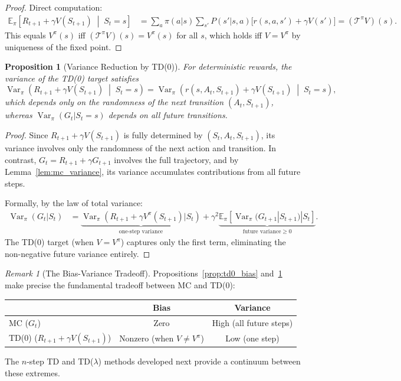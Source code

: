 \documentclass[11pt,a4paper]{article}
\theoremstyle{definition}
\theoremstyle{plain}
\newtheorem{proposition}[theorem]{Proposition}
\theoremstyle{remark}
\newtheorem{remark}{Remark}[section]
\DeclareMathOperator{\Var}{Var}
\newcommand{\E}{\mathbb{E}}
\begin{document}
\begin{proof}
Direct computation:
\begin{align}
    \E_\pi\!\left[R_{t+1} + \gamma V(S_{t+1}) \;\middle|\; S_t = s\right]
    &= \sum_a \pi(a|s) \sum_{s'} P(s'|s,a)\bigl[r(s,a,s') + \gamma V(s')\bigr]
    = (\mathcal{T}^\pi V)(s). \label{eq:td0_bias_proof}
\end{align}
This equals $V^\pi(s)$ iff $(\mathcal{T}^\pi V)(s) = V^\pi(s)$ for all $s$, which holds iff $V = V^\pi$ by uniqueness of the fixed point.
\end{proof}

\begin{proposition}[Variance Reduction by TD(0)]
\label{prop:td0_variance}
For deterministic rewards, the variance of the TD(0) target satisfies
\begin{equation}
    \Var_\pi\!\left(R_{t+1} + \gamma V(S_{t+1}) \;\middle|\; S_t = s\right)
    = \Var_\pi\!\left(r(s, A_t, S_{t+1}) + \gamma V(S_{t+1}) \;\middle|\; S_t = s\right),
    \label{eq:td0_variance}
\end{equation}
which depends only on the randomness of the \emph{next} transition $(A_t, S_{t+1})$, whereas $\Var_\pi(G_t | S_t = s)$ depends on all future transitions.
\end{proposition}

\begin{proof}
Since $R_{t+1} + \gamma V(S_{t+1})$ is fully determined by $(S_t, A_t, S_{t+1})$, its variance involves only the randomness of the next action and transition. In contrast, $G_t = R_{t+1} + \gamma G_{t+1}$ involves the full trajectory, and by Lemma~\ref{lem:mc_variance}, its variance accumulates contributions from all future steps.

Formally, by the law of total variance:
\begin{align}
    \Var_\pi(G_t | S_t) &= \underbrace{\Var_\pi\!\left(R_{t+1} + \gamma V^\pi(S_{t+1}) | S_t\right)}_{\text{one-step variance}} + \gamma^2 \underbrace{\E_\pi\!\left[\Var_\pi(G_{t+1} | S_{t+1}) | S_t\right]}_{\text{future variance} \geq 0}. \label{eq:variance_decomposition}
\end{align}
The TD(0) target (when $V = V^\pi$) captures only the first term, eliminating the non-negative future variance entirely.
\end{proof}

\begin{remark}[The Bias-Variance Tradeoff]
\label{rem:bias_variance}
Propositions~\ref{prop:td0_bias} and~\ref{prop:td0_variance} make precise the fundamental tradeoff between MC and TD(0):
\begin{center}
\begin{tabular}{lcc}
\toprule
& \textbf{Bias} & \textbf{Variance} \\
\midrule
MC ($G_t$) & Zero & High (all future steps) \\
TD(0) ($R_{t+1} + \gamma V(S_{t+1})$) & Nonzero (when $V \neq V^\pi$) & Low (one step) \\
\bottomrule
\end{tabular}
\end{center}
The $n$-step TD and TD($\lambda$) methods developed next provide a continuum between these extremes.
\end{remark}
\end{document}
